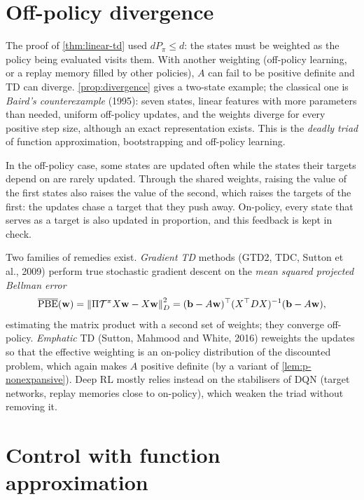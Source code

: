 \section{Off-policy divergence}

The proof of \cref{thm:linear-td} used $d P_\pi \leq d$: the states must be
weighted as the policy being evaluated visits them. With another weighting
(off-policy learning, or a replay memory filled by other policies), $A$ can
fail to be positive definite and TD can diverge. \cref{prop:divergence}
gives a two-state example; the classical one is \emph{Baird's
counterexample} (1995): seven states, linear features with more parameters
than needed, uniform off-policy updates, and the weights diverge for every
positive step size, although an exact representation exists. This is the
\emph{deadly triad} of function approximation, bootstrapping and
off-policy learning.

\begin{intuition}
  In the off-policy case, some states are updated often while the states
  their targets depend on are rarely updated. Through the shared weights,
  raising the value of the first states also raises the value of the
  second, which raises the targets of the first: the updates chase a target
  that they push away. On-policy, every state that serves as a target is
  also updated in proportion, and this feedback is kept in check.
\end{intuition}

Two families of remedies exist. \emph{Gradient TD} methods (GTD2, TDC,
Sutton et al., 2009) perform true stochastic gradient descent on the
\emph{mean squared projected Bellman error}
\begin{equation}
  \overline{\mathrm{PBE}}(\mathbf{w}) = \left\lVert \Pi \mathcal{T}^\pi X \mathbf{w} - X
  \mathbf{w} \right\rVert_D^2 = (\mathbf{b} - A \mathbf{w})^\top (X^\top D X)^{-1}
  (\mathbf{b} - A \mathbf{w}),
\end{equation}
estimating the matrix product with a second set of weights; they converge
off-policy. \emph{Emphatic} TD (Sutton, Mahmood and White, 2016) reweights
the updates so that the effective weighting is an on-policy distribution
of the discounted problem, which again makes $A$ positive definite (by a
variant of \cref{lem:p-nonexpansive}). Deep RL
mostly relies instead on the stabilisers of DQN (target networks, replay
memories close to on-policy), which weaken the triad without removing it.

\section{Control with function approximation}

